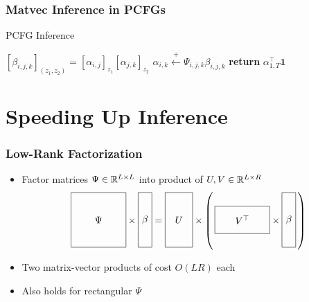 \documentclass{beamer}
\begin{document}
\begin{frame}
\frametitle{Matvec Inference in PCFGs}


\begin{algorithm}[H]
\caption{PCFG Inference}
\begin{algorithmic} 
\STATE $[\beta_{i,j,k}]_{(z_1,z_2)} = [\alpha_{i,j}]_{z_1}[\alpha_{j,k}]_{z_2}$
\ENDFOR
\STATE $\alpha_{i,k} \stackrel{+}{\gets} \Psi_{i,j,k}\beta_{i,j,k}$
\ENDFOR
\STATE \textbf{return} $\alpha_{1,T}^\top \mathbf{1}$
\end{algorithmic}

\end{algorithm}
\end{frame}

\section{Speeding Up Inference}

\begin{frame}
\frametitle{Low-Rank Factorization}
\begin{itemize}
\item Factor matrices $\Psi\in\mathbb{R}^{L\times L}$ into product of $U,V\in\mathbb{R}^{L \times R}$
\[
\vcenter{\hbox{\begin{tikzpicture}[baseline=-0.5ex]
    \draw (0,0) rectangle (2,2) node[pos=.5] {$\Psi$};
\end{tikzpicture}}}
\times
\vcenter{\hbox{\begin{tikzpicture}[baseline=-0.5ex]
    \draw (0,0) rectangle (.5,2) node[pos=.5] {$\beta$};
\end{tikzpicture}}}
=
\vcenter{\hbox{\begin{tikzpicture}[baseline=-0.5ex]
    \draw (0,0) rectangle (1,2) node[pos=.5] {$U$};
\end{tikzpicture}}}
\times
\left(\,
\vcenter{\hbox{\begin{tikzpicture}[baseline=-0.5ex]
    \draw (0,0) rectangle (2,1) node[pos=.5] {$V^\top$};
\end{tikzpicture}}}
\times
\vcenter{\hbox{\begin{tikzpicture}[baseline=-0.5ex]
    \draw (0,0) rectangle (.5,2) node[pos=.5] {$\beta$};
\end{tikzpicture}}}
\,\right)
\]
\item Two matrix-vector products of cost $O(LR)$ each
\vspace{1em}
\item Also holds for rectangular $\Psi$
\end{itemize}
\end{frame}
\end{document}
